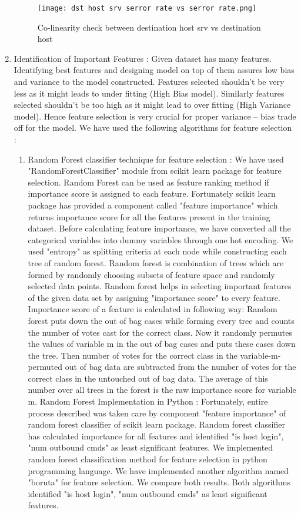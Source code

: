 \documentclass{acm_proc_article-sp}
\begin{document}
\begin{enumerate}
\begin{figure}[h]
\texttt{[image: dst host srv serror rate vs serror rate.png]}
\centering
\caption{Co-linearity check between destination host srv vs destination host}
\label{Co-linearity check between destination host srv serror rate vs serror rate}
\end{figure}

\item Identification of Important Features : Given dataset has many features. Identifying best features and designing model on top of them assures low bias and variance to the model constructed. Features selected shouldn't be very less as it might leads to under fitting (High Bias model). Similarly features selected shouldn't be too high as it might lead to over fitting (High Variance model). Hence feature selection is very crucial for proper variance – bias trade off for the model.
We have used the following algorithms for feature selection :

\begin{enumerate}
\item Random Forest classifier technique for feature selection :
We have used "RandomForestClassifier" module from scikit learn package for feature selection. Random Forest can be used as feature ranking method if importance score is assigned to each feature. Fortunately scikit learn package has provided a component called "feature importance" which returns importance score for all the features present in the training dataset. Before calculating feature importance, we have converted all the categorical variables into dummy variables through one hot encoding. We used "entropy" as splitting criteria at each node while constructing each tree of random forest. 
Random forest is combination of trees which are formed by randomly choosing subsets of feature space and randomly selected data points. Random forest helps in selecting important features of the given data set by assigning "importance score" to every feature. Importance score of a feature is calculated in following way:
Random forest puts down the out of bag cases while forming every tree and counts the number of votes cast for the correct class. Now it randomly permutes the values of variable m in the out of bag cases and puts these cases down the tree. Then number of votes for the correct class in the variable-m-permuted out of bag data  are subtracted from the number of votes for the correct class in the untouched out of bag data. The average of this number over all trees in the forest is the raw importance score for variable m.
Random Forest Implementation in Python :
Fortunately, entire process described was taken care by component "feature importance" of random forest classifier of scikit learn package.  Random forest classifier has calculated importance for all features and identified "is host login", "num outbound cmds" as least significant features. We implemented random forest classification method for feature selection in python programming language. We have implemented another algorithm named "boruta" for feature selection. We compare both results. Both algorithms identified "is host login", "num outbound cmds" as least significant features.


\end{enumerate}
\end{enumerate}
\end{document}
